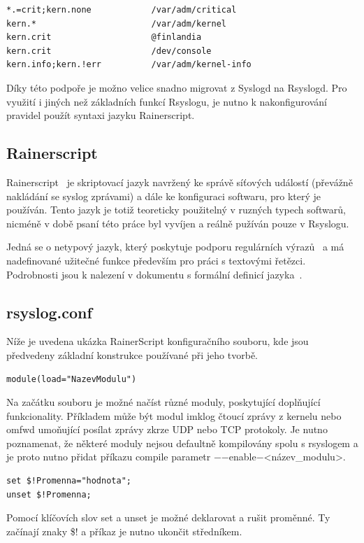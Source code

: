\documentclass[thesis=B,czech]{FITthesis}[2012/06/26]
\begin{document}
\begin{lstlisting}
*.=crit;kern.none            /var/adm/critical
kern.*                       /var/adm/kernel
kern.crit                    @finlandia
kern.crit                    /dev/console
kern.info;kern.!err          /var/adm/kernel-info
\end{lstlisting}

Díky této podpoře je možno velice snadno migrovat z Syslogd na Rsyslogd.
Pro využití i jiných než základních funkcí Rsyslogu, je nutno k nakonfigurování pravidel použít syntaxi jazyku Rainerscript.

\subsection{Rainerscript}
Rainerscript~\cite{RainerScript} je skriptovací jazyk navržený ke správě síťových událostí (převážně nakládání se syslog zprávami) a dále ke konfiguraci softwaru, pro který je používán.
Tento jazyk je totiž teoreticky použitelný v ruzných typech softwarů, nicméně v době psaní této práce byl vyvíjen a reálně pužíván pouze v Rsyslogu.

Jedná se o netypový jazyk, který poskytuje podporu regulárních výrazů~\cite{RainerScriptPropertyReplacer} a má nadefinované užitečné funkce především pro práci s textovými řetězci.
Podrobnosti jsou k nalezení v dokumentu s formální definicí jazyka~\cite{RainerScriptFormalDefinition}.

\subsection{rsyslog.conf}
Níže je uvedena ukázka RainerScript konfiguračního souboru, kde jsou předvedeny základní konstrukce používané při jeho tvorbě.

\begin{lstlisting}
module(load="NazevModulu")
\end{lstlisting}
Na začátku souboru je možné načíst různé moduly, poskytující doplňující funkcionality. Příkladem může být modul imklog čtoucí zprávy z kernelu nebo omfwd umoňující posílat zprávy zkrze UDP nebo TCP protokoly. Je nutno poznamenat, že některé moduly nejsou defaultně kompilovány spolu s rsyslogem a je proto nutno přidat příkazu compile parametr $-$$-$enable$-$<název\_modulu>.

\begin{lstlisting}
set $!Promenna="hodnota";
unset $!Promenna;
\end{lstlisting}
Pomocí klíčovích slov set a unset je možné deklarovat a rušit proměnné. Ty začínají znaky \$! a příkaz je nutno ukončit středníkem.
\end{document}
